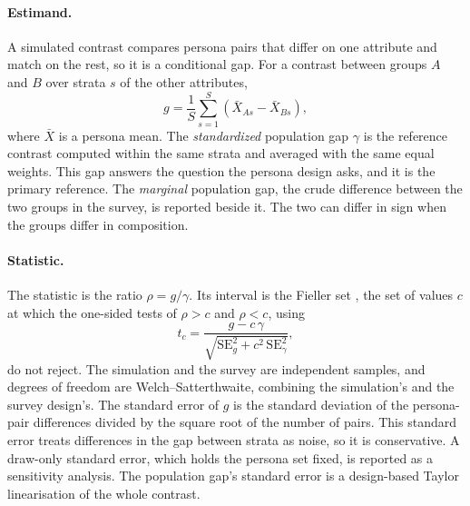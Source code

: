 \paragraph{Estimand.}
A simulated contrast compares persona pairs that differ on one attribute and match on the rest, so it is a conditional gap.
For a contrast between groups $A$ and $B$ over strata $s$ of the other attributes,
\begin{equation}
g = \frac{1}{S} \sum_{s=1}^{S} \left(\bar{X}_{A s} - \bar{X}_{B s}\right),
\end{equation}
where $\bar{X}$ is a persona mean.
The \emph{standardized} population gap $\gamma$ is the reference contrast computed within the same strata and averaged with the same equal weights.
This gap answers the question the persona design asks, and it is the primary reference.
The \emph{marginal} population gap, the crude difference between the two groups in the survey, is reported beside it.
The two can differ in sign when the groups differ in composition.

\paragraph{Statistic.}
The statistic is the ratio $\rho = g / \gamma$.
Its interval is the Fieller set \citep{fieller1954interval}, the set of values $c$ at which the one-sided tests of $\rho > c$ and $\rho < c$, using
\begin{equation}
t_c = \frac{g - c\,\gamma}{\sqrt{\mathrm{SE}_g^2 + c^2\,\mathrm{SE}_\gamma^2}},
\end{equation}
do not reject.
The simulation and the survey are independent samples, and degrees of freedom are Welch--Satterthwaite, combining the simulation's and the survey design's.
The standard error of $g$ is the standard deviation of the persona-pair differences divided by the square root of the number of pairs.
This standard error treats differences in the gap between strata as noise, so it is conservative.
A draw-only standard error, which holds the persona set fixed, is reported as a sensitivity analysis.
The population gap's standard error is a design-based Taylor linearisation of the whole contrast.

